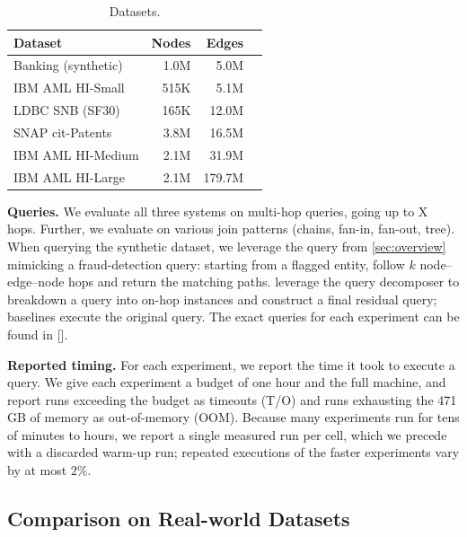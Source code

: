 \begin{table}[t]
\centering
\begin{tabular}{lrrr}
\toprule
\textbf{Dataset} & \textbf{Nodes} & \textbf{Edges} \\
\midrule
Banking (synthetic) & 1.0M & 5.0M \\
IBM AML HI-Small & 515K & 5.1M \\
LDBC SNB (SF30) & 165K & 12.0M \\
SNAP cit-Patents & 3.8M & 16.5M \\
IBM AML HI-Medium & 2.1M & 31.9M \\
IBM AML HI-Large & 2.1M & 179.7M \\
\bottomrule
\end{tabular}
\caption{Datasets.}
\label{tab:datasets}
\end{table}

\smallskip
\noindent\textbf{Queries.} We evaluate all three systems on multi-hop
queries, going up to X hops. Further, we evaluate \system on various join
patterns (chains, fan-in, fan-out, tree). When querying the synthetic
dataset, we leverage the query from \cref{sec:overview} mimicking a
fraud-detection query: starting from a flagged entity, follow $k$
node--edge--node hops and return the matching paths.
\system leverage the query decomposer to breakdown a query into on-hop
instances and construct a final residual query; baselines execute
the original query. The exact queries for each experiment can be
found in [].

\smallskip
\noindent\textbf{Reported timing.}
For each experiment, we report the time it took to execute a query.
We give each experiment a budget of one hour and the
full machine, and report runs exceeding the budget as timeouts (T/O) and
runs exhausting the 471 GB of memory as out-of-memory (OOM). Because many
experiments run for tens of minutes to hours, we report a single measured run per
cell, which we precede with a discarded warm-up run; repeated executions of
the faster experiments vary by at most $2\%$.

\subsection{Comparison on Real-world Datasets}
\label{sec:evaluation:cross}

